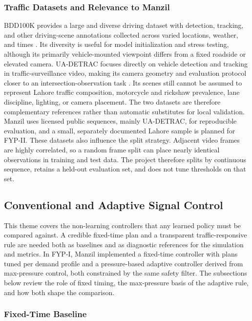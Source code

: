 \subsubsection{Traffic Datasets and Relevance to Manzil}

BDD100K provides a large and diverse driving dataset with detection, tracking, and other driving-scene annotations collected across varied locations, weather, and times \cite{yu2020bdd100k}. Its diversity is useful for model initialization and stress testing, although its primarily vehicle-mounted viewpoint differs from a fixed roadside or elevated camera. UA-DETRAC focuses directly on vehicle detection and tracking in traffic-surveillance video, making its camera geometry and evaluation protocol closer to an intersection-observation task \cite{wen2020uadetrac}. Its scenes still cannot be assumed to represent Lahore traffic composition, motorcycle and rickshaw prevalence, lane discipline, lighting, or camera placement. The two datasets are therefore complementary references rather than automatic substitutes for local validation. Manzil uses licensed public sequences, mainly UA-DETRAC, for reproducible evaluation, and a small, separately documented Lahore sample is planned for FYP-II. These datasets also influence the split strategy. Adjacent video frames are highly correlated, so a random frame split can place nearly identical observations in training and test data. The project therefore splits by continuous sequence, retains a held-out evaluation set, and does not tune thresholds on that set.

\subsection{Conventional and Adaptive Signal Control}

This theme covers the non-learning controllers that any learned policy must be compared against. A credible fixed-time plan and a transparent traffic-responsive rule are needed both as baselines and as diagnostic references for the simulation and metrics. In FYP-I, Manzil implemented a fixed-time controller with plans tuned per demand profile and a pressure-based adaptive controller derived from max-pressure control, both constrained by the same safety filter. The subsections below review the role of fixed timing, the max-pressure basis of the adaptive rule, and how both shape the comparison.

\subsubsection{Fixed-Time Baseline}

